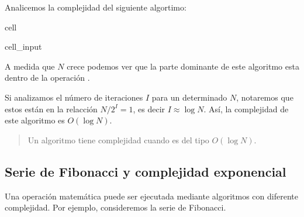 \documentclass[letterpaper,10pt,english]{jupyterBook}
\begin{document}
\sphinxAtStartPar
Analicemos la complejidad del siguiente algortimo:

\begin{sphinxuseclass}{cell}\begin{sphinxVerbatimInput}

\begin{sphinxuseclass}{cell_input}
\begin{sphinxVerbatim}[commandchars=\\\{\}]
 
    
      
       
          
          
        
     
\end{sphinxVerbatim}

\end{sphinxuseclass}\end{sphinxVerbatimInput}

\end{sphinxuseclass}
\sphinxAtStartPar
A medida que \(N\) crece podemos ver que la parte dominante de este algoritmo esta dentro de la operación .

\sphinxAtStartPar
Si analizamos el número de iteraciones \(I\) para un determinado \(N\), notaremos que estos están en la relacción \(N/2^I = 1\), es decir \(I\approx \log N\). Así, la complejidad de este algoritmo es \(O(\log N)\).
\begin{quote}

\sphinxAtStartPar
{} Un algoritmo tiene complejidad  cuando es del tipo \(O(\log N)\).
\end{quote}


\subsection{Serie de Fibonacci y complejidad exponencial}
\label{\detokenize{1.1-Aspectos_generales/1.1-Aspectos_generales:serie-de-fibonacci-y-complejidad-exponencial}}
\sphinxAtStartPar
Una operación matemática puede ser ejecutada mediante algoritmos con diferente complejidad. Por ejemplo, consideremos la serie de Fibonacci.
\end{document}
